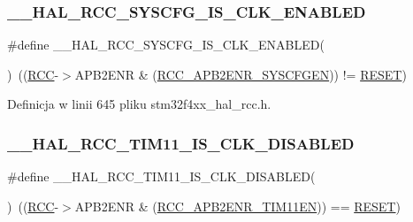 \subsubsection{\texorpdfstring{\+\_\+\+\_\+\+H\+A\+L\+\_\+\+R\+C\+C\+\_\+\+S\+Y\+S\+C\+F\+G\+\_\+\+I\+S\+\_\+\+C\+L\+K\+\_\+\+E\+N\+A\+B\+L\+ED}{\_\_HAL\_RCC\_SYSCFG\_IS\_CLK\_ENABLED}}
{\footnotesize\ttfamily \#define \+\_\+\+\_\+\+H\+A\+L\+\_\+\+R\+C\+C\+\_\+\+S\+Y\+S\+C\+F\+G\+\_\+\+I\+S\+\_\+\+C\+L\+K\+\_\+\+E\+N\+A\+B\+L\+ED(\begin{DoxyParamCaption}{ }\end{DoxyParamCaption})~((\hyperlink{group___peripheral__declaration_ga74944438a086975793d26ae48d5882d4}{R\+CC}-\/$>$A\+P\+B2\+E\+NR \& (\hyperlink{group___peripheral___registers___bits___definition_ga7a9d56a8aa1fa0f519ecbdf0d19dd4da}{R\+C\+C\+\_\+\+A\+P\+B2\+E\+N\+R\+\_\+\+S\+Y\+S\+C\+F\+G\+EN})) != \hyperlink{group___exported__types_gga89136caac2e14c55151f527ac02daaffa589b7d94a3d91d145720e2fed0eb3a05}{R\+E\+S\+ET})}



Definicja w linii 645 pliku stm32f4xx\+\_\+hal\+\_\+rcc.\+h.

\mbox{\label{group___r_c_c___a_p_b2___peripheral___clock___enable___disable___status_gacee7220c840db84ec10d0b89ab20fa1e}} 
\subsubsection{\texorpdfstring{\+\_\+\+\_\+\+H\+A\+L\+\_\+\+R\+C\+C\+\_\+\+T\+I\+M11\+\_\+\+I\+S\+\_\+\+C\+L\+K\+\_\+\+D\+I\+S\+A\+B\+L\+ED}{\_\_HAL\_RCC\_TIM11\_IS\_CLK\_DISABLED}}
{\footnotesize\ttfamily \#define \+\_\+\+\_\+\+H\+A\+L\+\_\+\+R\+C\+C\+\_\+\+T\+I\+M11\+\_\+\+I\+S\+\_\+\+C\+L\+K\+\_\+\+D\+I\+S\+A\+B\+L\+ED(\begin{DoxyParamCaption}{ }\end{DoxyParamCaption})~((\hyperlink{group___peripheral__declaration_ga74944438a086975793d26ae48d5882d4}{R\+CC}-\/$>$A\+P\+B2\+E\+NR \& (\hyperlink{group___peripheral___registers___bits___definition_gab1d2aeebc8ccf4e2ee18f4d924a35188}{R\+C\+C\+\_\+\+A\+P\+B2\+E\+N\+R\+\_\+\+T\+I\+M11\+EN})) == \hyperlink{group___exported__types_gga89136caac2e14c55151f527ac02daaffa589b7d94a3d91d145720e2fed0eb3a05}{R\+E\+S\+ET})}



